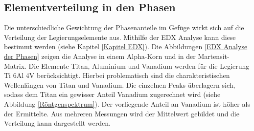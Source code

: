 \documentclass[a4paper, 11pt]{tubsreprt}
\begin{document}
\subsection{Elementverteilung in den Phasen}
Die unterschiedliche Gewichtung der Phasenanteile im Gefüge wirkt sich auf die Verteilung der Legierungselemente aus. Mithilfe der EDX Analyse kann diese bestimmt werden (siehe Kapitel \ref{Kapitel EDX}). Die Abbildungen \ref{EDX Analyse der Phasen} zeigen die Analyse in einem Alpha-Korn und in der Martensit-Matrix. Die Elemente Titan, Aluminium und Vanadium werden für die Legierung Ti 6Al 4V berücksichtigt. Hierbei problematisch sind die charakteristischen Wellenlängen von Titan und Vanadium. Die einzelnen Peaks überlagern sich, sodass dem Titan ein gewisser Anteil Vanadium zugerechnet wird (siehe Abbildung \ref{Röntgenspektrum}). Der vorliegende Anteil an Vanadium ist höher als der Ermittelte. Aus mehreren Messungen wird der Mittelwert gebildet und die Verteilung kann dargestellt werden.
\end{document}

